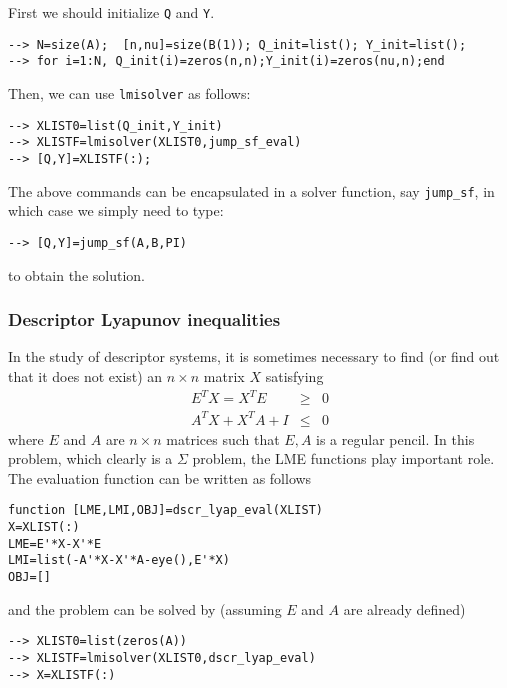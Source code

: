 \documentclass{article}
\begin{document}
First we should initialize {\tt Q} and {\tt Y}. 
\begin{verbatim}
--> N=size(A);  [n,nu]=size(B(1)); Q_init=list(); Y_init=list();
--> for i=1:N, Q_init(i)=zeros(n,n);Y_init(i)=zeros(nu,n);end
\end{verbatim}
Then, we can use {\tt lmisolver} as follows:
\begin{verbatim}
--> XLIST0=list(Q_init,Y_init)
--> XLISTF=lmisolver(XLIST0,jump_sf_eval)
--> [Q,Y]=XLISTF(:);
\end{verbatim}

The above commands can be encapsulated in a solver function, say 
{\tt jump{\_}sf},
in which case we simply need to type:
\begin{verbatim}
--> [Q,Y]=jump_sf(A,B,PI)         
\end{verbatim}
to obtain the solution.


\subsubsection{Descriptor Lyapunov inequalities}
\label{ex3}
In the study of descriptor systems, it is sometimes 
necessary to find (or find out that it does not exist)
an $n\times n$ matrix $X$ satisfying
\begin{eqnarray*}
E^TX=X^TE&\geq&0\\
A^TX+X^TA+I&\leq&0
\end{eqnarray*}
where $E$ and $A$ are $n\times n$ matrices such that ${E,A}$ is a regular pencil.
In this problem, which clearly is a $\Sigma$ problem,
the LME functions play important role. The evaluation function
can be written as follows
\begin{verbatim}
function [LME,LMI,OBJ]=dscr_lyap_eval(XLIST)
X=XLIST(:)
LME=E'*X-X'*E
LMI=list(-A'*X-X'*A-eye(),E'*X)
OBJ=[]
\end{verbatim}
and the problem can be solved by (assuming $E$ and $A$ are
already defined)
\begin{verbatim}
--> XLIST0=list(zeros(A))
--> XLISTF=lmisolver(XLIST0,dscr_lyap_eval)
--> X=XLISTF(:)
\end{verbatim}
\end{document}
